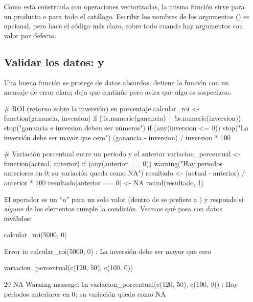 Como está construida con operaciones vectorizadas, la misma función sirve
para un producto o para todo el catálogo. Escribir los nombres de los
argumentos () es opcional, pero hace el código más
claro, sobre todo cuando hay argumentos con valor por defecto.

\subsection{Validar los datos: \texorpdfstring{}{stop()} y \texorpdfstring{}{warning()}}

Una buena función se protege de datos absurdos.  detiene la
función con un mensaje de error claro;  deja que continúe
pero avisa que algo es sospechoso.

\begin{rcode}
# ROI (retorno sobre la inversión) en porcentaje
calcular_roi <- function(ganancia, inversion) {
  if (!is.numeric(ganancia) || !is.numeric(inversion)) {
    stop("ganancia e inversion deben ser números")
  }
  if (any(inversion <= 0)) {
    stop("La inversión debe ser mayor que cero")
  }
  (ganancia - inversion) / inversion * 100
}

# Variación porcentual entre un periodo y el anterior
variacion_porcentual <- function(actual, anterior) {
  if (any(anterior == 0)) {
    warning("Hay periodos anteriores en 0; su variación queda como NA")
  }
  resultado <- (actual - anterior) / anterior * 100
  resultado[anterior == 0] <- NA
  round(resultado, 1)
}
\end{rcode}

El operador \codigo{||} es un ``o'' para un solo valor (dentro de
 se prefiere a \codigo{|}) y  responde
 si \emph{alguno} de los elementos cumple la condición. Veamos
qué pasa con datos inválidos:

\begin{rnoejecutar}
calcular_roi(5000, 0)
\end{rnoejecutar}
\begin{rsalida}
Error in calcular_roi(5000, 0) : La inversión debe ser mayor que cero
\end{rsalida}

\begin{rnoejecutar}
variacion_porcentual(c(120, 50), c(100, 0))
\end{rnoejecutar}
\begin{rsalida}
[1] 20 NA
Warning message:
In variacion_porcentual(c(120, 50), c(100, 0)) :
  Hay periodos anteriores en 0; su variación queda como NA
\end{rsalida}

